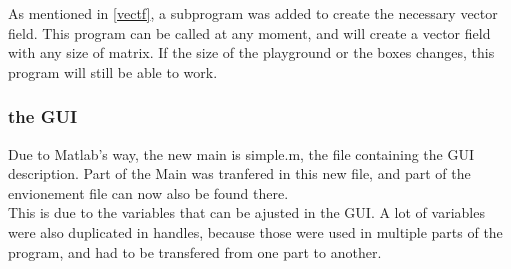 As mentioned in \ref{vectf}, a subprogram was added to create the necessary vector field.
This program can be called at any moment, and will create a vector field with any size of matrix.
If the size of the playground or the boxes changes, this program will still be able to work.

\subsubsection{the GUI}

Due to Matlab's way, the new main is simple.m, the file containing the GUI description.
Part of the Main was tranfered in this new file, and part of the envionement file can now also be found there.\\

This is due to the variables that can be ajusted in the GUI.
A lot of variables were also duplicated in handles, because those were used in multiple parts of the program, and had to be transfered from one part to another.
